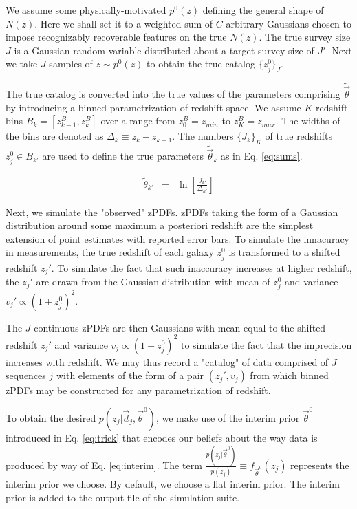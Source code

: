 \documentclass[preprint]{aastex}
\begin{document}
We assume some physically-motivated $p^{0}(z)$ defining the general shape of $N(z)$.  Here we shall set it to a weighted sum of $C$ arbitrary Gaussians chosen to impose recognizably recoverable features on the true $N(z)$.  The true survey size $J$ is a Gaussian random variable distributed about a target survey size of $J'$.  Next we take $J$ samples of $z\sim p^{0}(z)$ to obtain the true catalog $\{z_{j}^{0}\}_{J}$.  

The true catalog is converted into the true values of the parameters comprising $\tilde{\vec{\theta}}$ by introducing a binned parametrization of redshift space.  We assume $K$ redshift bins $B_{k}=[z^{B}_{k-1},z^{B}_{k}]$ over a range from $z^{B}_{0}=z_{min}$ to $z^{B}_{K}=z_{max}$.  The widths of the bins are denoted as $\Delta_{k}\equiv z_{k}-z_{k-1}$.  The numbers $\{J_{k}\}_{K}$ of true redshifts $z^{0}_{j}\in B_{k'}$ are used to define the true parameters $\tilde{\vec{\theta}}_{k}$ as in Eq. \ref{eq:sums}.

\begin{eqnarray}
\label{eq:sums}
\tilde{\theta}_{k'} &=& \ln\left[\frac{J_{k'}}{\Delta_{k'}}\right]
\end{eqnarray}

Next, we simulate the "observed" zPDFs.  zPDFs taking the form of a Gaussian distribution around some maximum a posteriori redshift are the simplest extension of point estimates with reported error bars.  To simulate the innacuracy in measurements, the true redshift of each galaxy $z_{j}^{0}$ is transformed to a shifted redshift $z_{j}'$.  To simulate the fact that such inaccuracy increases at higher redshift, the $z_{j}'$ are drawn from the Gaussian distribution with mean of $z_{j}^{0}$ and variance $v_{j}'\propto(1+z_{j}^{0})^{2}$.

The $J$ continuous zPDFs are then Gaussians with mean equal to the shifted redshift $z_{j}'$ and variance $v_{j}\propto(1+z_{j}^{0})^{2}$ to simulate the fact that the imprecision increases with redshift.  We may thus record a "catalog" of data comprised of $J$ sequences $j$ with elements of the form of a pair $(z_{j}',v_{j})$ from which binned zPDFs may be constructed for any parametrization of redshift.  

To obtain the desired $p(z_{j}|\vec{d}_{j},\vec{\theta}^{0})$, we make use of the interim prior $\vec{\theta}^{0}$ introduced in Eq. \ref{eq:trick} that encodes our beliefs about the way data is produced by way of Eq. \ref{eq:interim}.  The term $\frac{p(z_{j}|\vec{\theta}^{0})}{p(z_{j})}\equiv f_{\vec{\theta}^{0}}(z_{j})$ represents the interim prior we choose.  By default, we choose a flat interim prior.  The interim prior is added to the output file of the simulation suite.  
\end{document}
